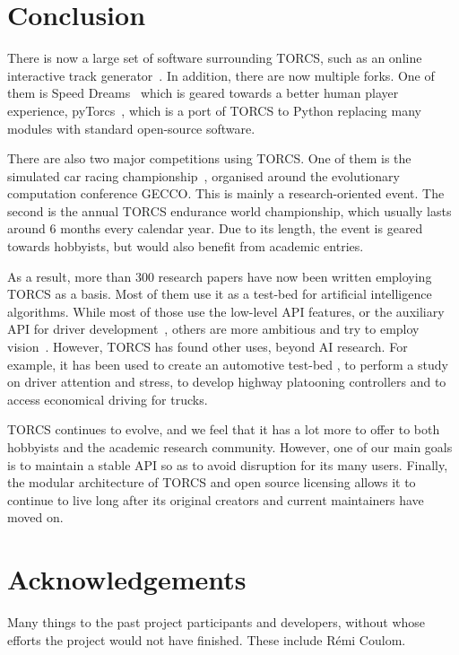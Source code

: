 \documentclass[a4paper]{article}
\begin{document}
\section{Conclusion}

There is now a large set of software surrounding TORCS, such as an online interactive track generator~\cite{cardamone2011interactive}. In addition, there are now multiple forks. One of them is Speed Dreams~\cite{speed-dreams} which is geared towards a better human player experience, pyTorcs~\cite{pytorcs}, which is a port of TORCS to Python replacing many modules  with standard open-source software.

There are also two major competitions using TORCS. One of them is the simulated car racing championship~\cite{car-racing}, organised around the evolutionary computation conference GECCO. This is mainly a research-oriented event. The second is the annual TORCS endurance world championship\cite{torcs-endurance}, which usually lasts around 6 months every calendar year. Due to its length, the event is geared towards hobbyists, but would also benefit from academic entries.

As a result, more than 300 research papers have now been written employing TORCS as a basis. Most of them use it as a test-bed for artificial intelligence algorithms. While most of those use the low-level API features, or the auxiliary API for driver development~\cite{caldeiratorcs}, others are more ambitious and try to employ vision~\cite{koutnikevolving,tran2010towards}. 
However, TORCS has found other uses, beyond AI research. For example, it has been used to create an automotive test-bed \cite{drolia2011autoplug}, to perform a study on driver attention and stress\cite{benoit2009multimodal}, to develop highway platooning controllers and to access economical driving for trucks\cite{bogoni2012use}.

TORCS continues to evolve, and we feel that it has a lot more to offer to both hobbyists and the academic research community. However, one of our main goals is to maintain a stable API so as to avoid disruption for its many users. Finally, the modular architecture of TORCS and open source licensing allows it to continue to live long after its original creators and current maintainers have moved on. 

\section*{Acknowledgements}
Many things to the past project participants and developers, without whose efforts the project would not have finished. These include R\'emi Coulom.



\end{document}
